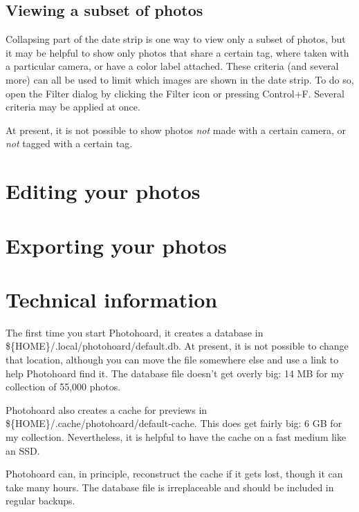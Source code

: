 \documentclass[11pt]{report}
\begin{document}
\section{Viewing a subset of photos}

Collapsing part of the date strip is one way to view only a subset
of photos, but it may be helpful to show only photos that share a
certain tag, where taken with a particular camera, or have a color label
attached. These criteria (and several more) can all be used to limit which
images are shown in the date strip. To do so, open the Filter dialog
by clicking the Filter icon or pressing Control+F. Several criteria
may be applied at once.

At present, it is not possible to
show photos \emph{not} made with a certain camera, or \emph{not}
tagged with a certain tag.

\chapter{Editing your photos}

\chapter{Exporting your photos}


\chapter{Technical information}
The first time you start Photohoard, it creates a database in
\$\{HOME\}/.local/photohoard/default.db. At present, it is not possible to change
that location, although you can move the file somewhere else and use a
link to help Photohoard find it. The database file doesn't get overly
big: 14 MB for my collection of 55,000 photos.

Photohoard also creates a cache for previews in
\$\{HOME\}/.cache/photohoard/default-cache. This does get fairly big:
6 GB for my collection. Nevertheless, it is helpful to have the cache
on a fast medium like an SSD.

Photohoard can, in principle, reconstruct the cache if it gets lost,
though it can take many hours. The database file is irreplaceable
and should be included in regular backups.
\end{document}
